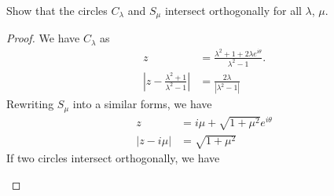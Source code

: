 \documentclass[12pt]{article}
\begin{document}
    \begin{subquestion}
        Show that the circles $C_\lambda$ and $S_\mu$
        intersect orthogonally for all $\lambda$, $\mu$.
    \end{subquestion}
    \begin{proof}
        We have $C_\lambda$ as 
        \begin{align*}
            z 
            &= \frac{\lambda^{2}+1+2\lambda e^{i\theta}}{\lambda^{2}-1}.\\
            \left|z - \frac{\lambda^{2}+1}{\lambda^{2}-1}\right|
            &= \frac{2\lambda}{|\lambda^{2}-1|}
        \end{align*}
        Rewriting $S_\mu$ into a similar forms, we have
        \begin{align*}
            z 
            &= i\mu + \sqrt{1+\mu^{2}}e^{i\theta}\\
            |z - i\mu|
            &= \sqrt{1+\mu^{2}}
        \end{align*}
        If two circles intersect orthogonally, we have
        \begin{center}
\end{center}
\end{proof}
\end{document}
